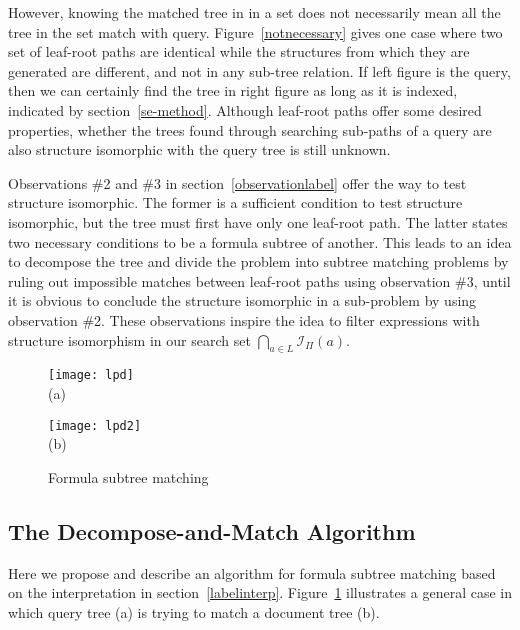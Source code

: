 However, knowing the matched tree in in a set does not necessarily mean all the tree in the set match with query. 
Figure~\ref{notnecessary} gives one case where two set of leaf-root paths are identical while the structures from which they are generated are different, and not in any sub-tree relation. If left figure is the query, then we can certainly find the tree in right figure as long as it is indexed, indicated by section~\ref{se-method}.
Although leaf-root paths offer some desired properties, whether the trees found through searching sub-paths of a query are also structure isomorphic with the query tree is still unknown. 

Observations \#2 and \#3 in section~\ref{observationlabel} offer the way to test structure isomorphic.
The former is a sufficient condition to test structure isomorphic, but the tree must first have only one leaf-root path. The latter states two necessary conditions to be a formula subtree of another.
This leads to an idea to decompose the tree and divide the problem into subtree matching problems by ruling out impossible matches between leaf-root paths using observation \#3, until it is obvious to conclude the structure isomorphic in a sub-problem by using observation \#2.
These observations inspire the idea to filter expressions with structure isomorphism in our search set $\bigcap_{a \in L} \mathcal{I}_{\Pi}(a)$.

\begin{figure}
\begin{minipage}[b]{2.65in}
\begin{center}
\texttt{[image: lpd]}
\\ (a)
\end{center}
\end{minipage}
\hspace*{.38in}
\begin{minipage}[b]{2.65in}
\begin{center}
{\texttt{[image: lpd2]}}
\\ (b) 
\end{center}
\end{minipage}
\caption{Formula subtree matching}\label{submatch}
\end{figure}

\subsection{The Decompose-and-Match Algorithm}
Here we propose and describe an algorithm for formula subtree matching based on the interpretation in section~\ref{labelinterp}.
Figure~\ref{submatch} illustrates a general case in which query tree (a) is trying to match a document tree (b).

